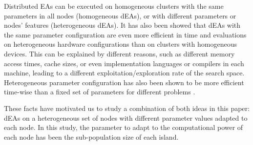 \documentclass[final,1p,times]{elsarticle}
\begin{document}
Distributed EAs can be executed on homogeneous clusters with the same parameters in all nodes (homogeneous dEAs), or with different parameters or nodes' features (heterogeneous dEAs).
It  has also been showed \cite{HETEROGENEOUSHARD} that dEAs with the same parameter configuration are even
more efficient in time and evaluations on heterogeneous hardware configurations than on clusters with
homogeneous devices. This can be explained by different reasons, such
as different memory access times, cache sizes, %
or even implementation
languages or compilers in each machine, leading to a different
exploitation/exploration rate of the search space. %
Heterogeneous parameter
configuration  has also been shown to be more  efficient time-wise than a fixed
set %
of parameters for different problems
\cite{HETEROGENEOUSPARAMETERS}.   %

These facts have motivated us to study a combination of both ideas in this paper: dEAs on a heterogeneous set of nodes with different parameter values adapted to each node. In this study, the parameter to adapt to the computational power of each node has been the sub-population size of each island.

\end{document}
